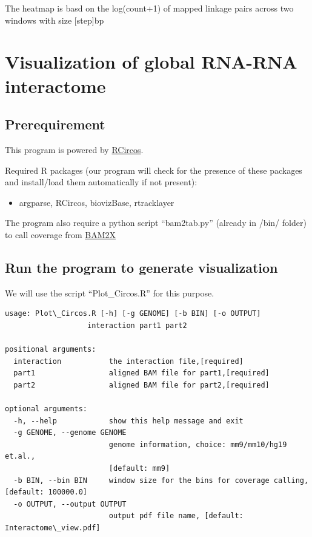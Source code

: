 \documentclass[letterpaper,10pt,english]{sphinxmanual}
\begin{document}
The heatmap is basd on the log(count+1) of mapped linkage pairs across two windows with size {[}step{]}bp


\chapter{Visualization of global RNA-RNA interactome}
\label{Visualization:visualizationglobal}\label{Visualization:visualization-of-global-rna-rna-interactome}

\section{Prerequirement}
\label{Visualization:id3}
This program is powered by \href{http://cran.r-project.org/web/packages/RCircos/index.html}{RCircos}.

Required R packages (our program will check for the presence of these packages and install/load them automatically if not present):
\begin{itemize}
\item {} 
argparse, RCircos, biovizBase, rtracklayer

\end{itemize}

The program also require a python script ``bam2tab.py'' (already in /bin/ folder) to call coverage from \href{https://github.com/nimezhu/bam2x/blob/master/scripts/bed2tab.py}{BAM2X}


\section{Run the program to generate visualization}
\label{Visualization:id4}
We will use the script ``Plot\_Circos.R'' for this purpose.

\begin{Verbatim}[commandchars=\\\{\}]
usage: Plot\_Circos.R [-h] [-g GENOME] [-b BIN] [-o OUTPUT]
                   interaction part1 part2

positional arguments:
  interaction           the interaction file,[required]
  part1                 aligned BAM file for part1,[required]
  part2                 aligned BAM file for part2,[required]

optional arguments:
  -h, --help            show this help message and exit
  -g GENOME, --genome GENOME
                        genome information, choice: mm9/mm10/hg19 et.al.,
                        [default: mm9]
  -b BIN, --bin BIN     window size for the bins for coverage calling, [default: 100000.0]
  -o OUTPUT, --output OUTPUT
                        output pdf file name, [default: Interactome\_view.pdf]
\end{Verbatim}
\end{document}
